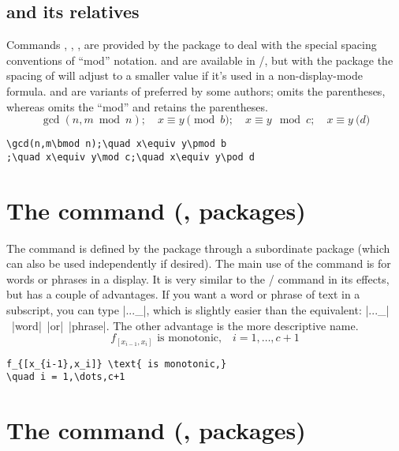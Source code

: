 \documentclass[leqno,titlepage,openany]{amsldoc}
\begin{document}
\section{ and its relatives}

Commands , , ,  are provided by the
 package to deal with the special spacing conventions of
``mod'' notation.  and  are available in \latex/, but
with the  package the spacing of  will adjust to a
smaller value if it's used in a non-display-mode formula.  and
 are variants of  preferred by some authors; 
omits the parentheses, whereas  omits the ``mod'' and retains
the parentheses.
\begin{equation}
\gcd(n,m\bmod n);\quad x\equiv y\pmod b
;\quad x\equiv y\mod c;\quad x\equiv y\pod d
\end{equation}
\begin{verbatim}
\gcd(n,m\bmod n);\quad x\equiv y\pmod b
;\quad x\equiv y\mod c;\quad x\equiv y\pod d
\end{verbatim}

\chapter{The  command (,  packages)}

The  command is defined by the  package through a
subordinate package  (which can also be used independently
if desired). The main use of the command  is for words or
phrases in a display. It is very
similar to the \latex/ command  in its effects, but has a
couple of advantages. If you want a word or phrase of text in a
subscript, you can type |..._{}|, which is slightly
easier than the  equivalent: |..._{\mbox{\scriptsize| |word|
|or| |phrase}}|. The other advantage is the more descriptive name.
\begin{equation}
f_{[x_{i-1},x_i]} \text{ is monotonic,}
\quad i = 1,\dots,c+1
\end{equation}
\begin{verbatim}
f_{[x_{i-1},x_i]} \text{ is monotonic,}
\quad i = 1,\dots,c+1
\end{verbatim}

\chapter{The  command (, 
packages)}
\end{document}
